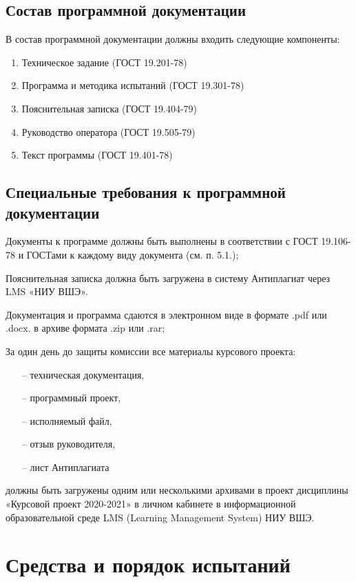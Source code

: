 \documentclass{../includes/TechDocMultiAuthors}
\begin{document}
    \subsection{Состав программной документации}

    В состав программной документации должны входить следующие компоненты:
    \begin{enumerate}
        \item Техническое задание (ГОСТ 19.201-78)
        \item Программа и методика испытаний (ГОСТ 19.301-78)
        \item Пояснительная записка (ГОСТ 19.404-79)
        \item Руководство оператора (ГОСТ 19.505-79)
        \item Текст программы (ГОСТ 19.401-78)
    \end{enumerate}

    \subsection{Специальные требования к программной документации}

    Документы к программе должны быть выполнены в соответствии с ГОСТ 19.106-78 и ГОСТами к каждому виду документа (см. п. 5.1.);

    Пояснительная записка должна быть загружена в систему Антиплагиат через LMS «НИУ ВШЭ».

    Документация и программа сдаются в электронном виде в формате .pdf или .docx. в архиве формата .zip или .rar;

    За один день до защиты комиссии все материалы курсового проекта:
    \begin{itemize}
        \item[--] техническая документация,
        \item[--] программный проект,
        \item[--] исполняемый файл,
        \item[--] отзыв руководителя,
        \item[--] лист Антиплагиата
    \end{itemize}
    должны быть загружены одним или несколькими архивами в проект дисциплины «Курсовой проект 2020-2021» в личном кабинете в информационной образовательной среде LMS (Learning Management System) НИУ ВШЭ.

    \section{Средства и порядок испытаний}
\end{document}
